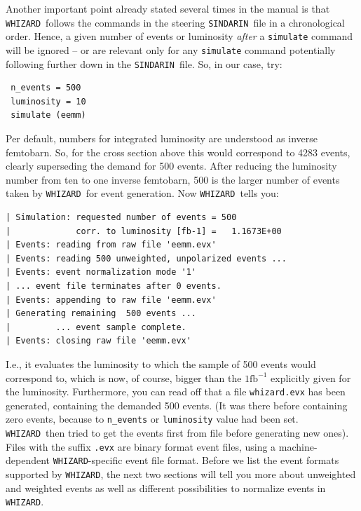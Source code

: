 \documentclass[12pt]{book}
\newcommand{\ttt}[1]{\texttt{#1}}
\newcommand{\whizard}{\ttt{WHIZARD}}
\newcommand{\sindarin}{\ttt{SINDARIN}}
\newcommand{\fb}{\textrm{fb}}
\begin{document}
Another important point already stated several times in the manual is
that \whizard\ follows the commands in the steering \sindarin\ file in a
chronological order. Hence, a given number of events or luminosity
{\em after} a \ttt{simulate} command will be ignored -- or are
relevant only for any \ttt{simulate} command potentially following
further down in the \sindarin\ file. So, in our case, try:
\begin{verbatim}
 n_events = 500
 luminosity = 10
 simulate (eemm)
\end{verbatim}
Per default, numbers for integrated luminosity are understood as
inverse femtobarn. So, for the cross section above this would
correspond to 4283 events, clearly superseding the demand for 500
events. After reducing the luminosity number from ten to one inverse
femtobarn, 500 is the larger number of events taken by \whizard\ for
event generation. Now \whizard\ tells you:
\begin{verbatim}
| Simulation: requested number of events = 500
|             corr. to luminosity [fb-1] =   1.1673E+00
| Events: reading from raw file 'eemm.evx'
| Events: reading 500 unweighted, unpolarized events ...
| Events: event normalization mode '1'
| ... event file terminates after 0 events.
| Events: appending to raw file 'eemm.evx'
| Generating remaining  500 events ...
|         ... event sample complete.
| Events: closing raw file 'eemm.evx'
\end{verbatim}
I.e., it evaluates the luminosity to which the sample of 500 events
would correspond to, which is now, of course, bigger than the $1
\fb^{-1}$ explicitly given for the luminosity. Furthermore, you can
read off that a file \ttt{whizard.evx} has been generated, containing
the demanded 500 events. (It was there before containing zero events,
because to \ttt{n\_events} or \ttt{luminosity} value had been
set. \whizard\ then tried to get the events first from file before
generating new ones). Files with the suffix \ttt{.evx} are binary
format event files, using a machine-dependent \whizard-specific
event file format. Before we list the event formats supported by
\whizard, the next two sections will tell you more about unweighted and
weighted events as well as different possibilities to normalize events
in \whizard.
\end{document}
